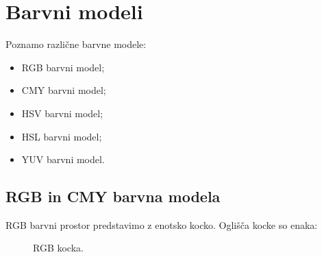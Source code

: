 \section{Barvni modeli}
\label{sec:bravnimodeli}
Poznamo različne barvne modele:
%
\begin{itemize}
\item RGB barvni model;
\item CMY barvni model;
\item HSV barvni model;
\item HSL barvni model;
\item YUV barvni model.
\end{itemize}
%
\subsection{RGB in CMY barvna modela}
RGB barvni prostor predstavimo z enotsko kocko. Oglišča kocke so enaka:

\begin{figure}[htbp]
  \centering
  \caption{RGB kocka.}
  \label{fig:rgbcube}
\end{figure}

